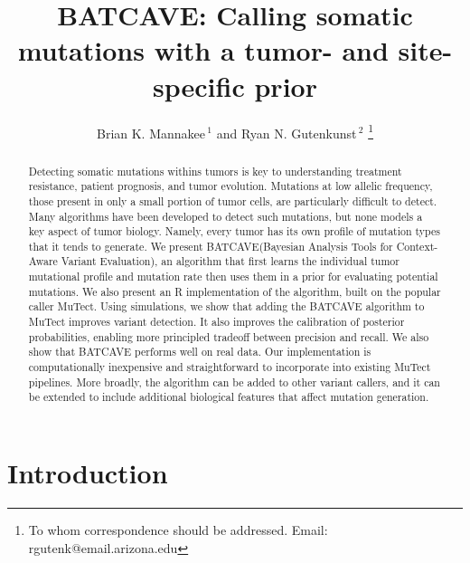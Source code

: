 \documentclass[a4,center,fleqn]{NAR}
\newcommand{\batcave}{BATCAVE\xspace}
\begin{document}
\title{\batcave: Calling somatic mutations with a tumor- and site-specific prior}

\author{%
Brian K. Mannakee\,$^{1}$ and
Ryan N. Gutenkunst\,$^{2}$%
\footnote{To whom correspondence should be addressed.
Email: rgutenk@email.arizona.edu}}

\address{%
$^{1}$Mel and Enid Zuckerman College of Public Health, University of Arizona, Tucson AZ
and
$^{2}$Department of Molecular and Cellular Biology, University of Arizona, Tucson AZ}


\maketitle

\begin{abstract}
Detecting somatic mutations withins tumors is key to understanding treatment resistance, patient prognosis, and tumor evolution.
Mutations at low allelic frequency, those present in only a small portion of tumor cells, are particularly difficult to detect.
Many algorithms have been developed to detect such mutations, but none models a key aspect of tumor biology.
Namely, every tumor has its own profile of mutation types that it tends to generate.
We present \batcave (Bayesian Analysis Tools for Context-Aware Variant Evaluation), an algorithm that first learns the individual tumor mutational profile and mutation rate then uses them in a prior for evaluating potential mutations.
We also present an R implementation of the algorithm, built on the popular caller MuTect.
Using simulations, we show that adding the \batcave algorithm to MuTect improves variant detection.
It also improves the calibration of posterior probabilities, enabling more principled tradeoff between precision and recall.
We also show that \batcave performs well on real data.
Our implementation is computationally inexpensive and straightforward to incorporate into existing MuTect pipelines.
More broadly, the algorithm can be added to other variant callers, and it can be extended to include additional biological features that affect mutation generation.
\end{abstract}


\section{Introduction}
\end{document}
